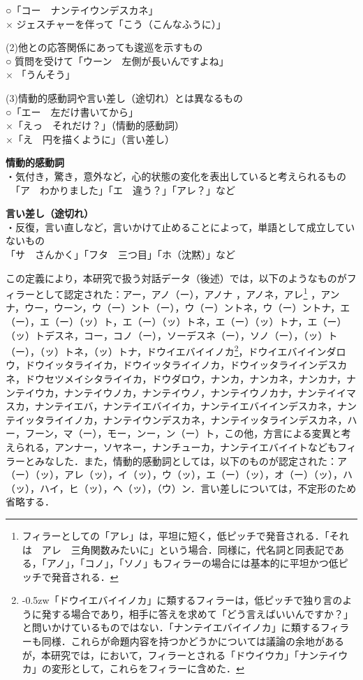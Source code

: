 \documentclass[japanese]{jnlp_1.3a}
\begin{document}
\noindent ○「コー　ナンテイウンデスカネ」\\
× ジェスチャーを伴って「こう（こんなふうに）」

\noindent (2)他との応答関係にあっても逡巡を示すもの\\
○ 質問を受けて「ウーン　左側が長いんですよね」\\
× 「うんそう」

\noindent (3)情動的感動詞\cite{森山:96}や言い差し（途切れ）とは異なるもの\\
○「エー　左だけ書いてから」\\
×「えっ　それだけ？」（情動的感動詞）\\
×「え　円を描くように」（言い差し）

\vspace{10pt}
\noindent \textbf{情動的感動詞}\\
・気付き，驚き，意外など，心的状態の変化を表出していると考えられるもの\\
　「ア　わかりました」「エ　違う？」「アレ？」など

\vspace{10pt}
\noindent\textbf{言い差し（途切れ）}\\
・反復，言い直しなど，言いかけて止めることによって，単語として成立していないもの\\
「サ　さんかく」「フタ　三つ目」「ホ（沈黙）」など

\vspace{10pt}
この定義により，本研究で扱う対話データ（後述）では，以下のようなものがフィラーとして認定された：アー，アノ（ー），アノナ
，アノネ，アレ\footnote{フィラーとしての「アレ」は，平坦に短く，低ピッチで発音される．「それは　アレ　三角関数みたいに」という場合．同様に，代名詞と同表記である，「アノ」，「コノ」，「ソノ」もフィラーの場合には基本的に平坦かつ低ピッチで発音される．}
，アンナ，ウー，ウーン，ウ（ー）ント（ー），ウ（ー）ントネ，ウ（ー）ントナ，エ（ー），エ（ー）（ッ）ト，エ（ー）（ッ）トネ，エ（ー）（ッ）トナ，エ（ー）（ッ）トデスネ，コー，コノ（ー），ソーデスネ（ー），ソノ（ー），（ッ）ト（ー），（ッ）トネ，（ッ）トナ，ドウイエバイイノカ\footnote{{\kern-0.5zw}「ドウイエバイイノカ」に類するフィラーは，低ピッチで独り言のように発する場合であり，相手に答えを求めて「どう言えばいいんですか？」と問いかけているものではない．「ナンテイエバイイノカ」に類するフィラーも同様．これらが命題内容を持つかどうかについては議論の余地があるが，本研究では，において，フィラーとされる「ドウイウカ」「ナンテイウカ」の変形として，これらをフィラーに含めた．}，ドウイエバイインダロウ，ドウイッタライイカ，ドウイッタライイノカ，ドウイッタライインデスカネ，ドウセツメイシタライイカ，ドウダロウ，ナンカ，ナンカネ，ナンカナ，ナンテイウカ，ナンテイウノカ，ナンテイウノ，ナンテイウノカナ，ナンテイイマスカ，ナンテイエバ，ナンテイエバイイカ，ナンテイエバイインデスカネ，ナンテイッタライイノカ，ナンテイウンデスカネ，ナンテイッタラインデスカネ，ハー，フーン，マ（ー），モー，ンー，ン（ー）ト，この他，方言による変異と考えられる，アンナー，ソヤネー，ナンチューカ，ナンテイエバイイトなどもフィラーとみなした．また，情動的感動詞としては，以下のものが認定された：ア（ー）（ッ），アレ（ッ），イ（ッ），ウ（ッ），エ（ー）（ッ），オ（ー）（ッ），ハ（ッ），ハイ，ヒ（ッ），ヘ（ッ），（ウ）ン．言い差しについては，不定形のため省略する．
\end{document}
